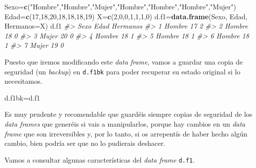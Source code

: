 \documentclass[
]{book}
\newenvironment{Shaded}{\begin{snugshade}}{\end{snugshade}}
\newcommand{\CommentTok}[1]{\textcolor[rgb]{0.56,0.35,0.01}{\textit{#1}}}
\newcommand{\DataTypeTok}[1]{\textcolor[rgb]{0.13,0.29,0.53}{#1}}
\newcommand{\DecValTok}[1]{\textcolor[rgb]{0.00,0.00,0.81}{#1}}
\newcommand{\KeywordTok}[1]{\textcolor[rgb]{0.13,0.29,0.53}{\textbf{#1}}}
\newcommand{\NormalTok}[1]{#1}
\newcommand{\StringTok}[1]{\textcolor[rgb]{0.31,0.60,0.02}{#1}}
\theoremstyle{definition}
\theoremstyle{definition}
\theoremstyle{definition}
\theoremstyle{remark}
\begin{document}
\begin{Shaded}
\begin{Highlighting}[]
\NormalTok{Sexo=}\KeywordTok{c}\NormalTok{(}\StringTok{"Hombre"}\NormalTok{,}\StringTok{"Hombre"}\NormalTok{,}\StringTok{"Mujer"}\NormalTok{,}\StringTok{"Hombre"}\NormalTok{,}\StringTok{"Hombre"}\NormalTok{,}\StringTok{"Hombre"}\NormalTok{,}\StringTok{"Mujer"}\NormalTok{)}
\NormalTok{Edad=}\KeywordTok{c}\NormalTok{(}\DecValTok{17}\NormalTok{,}\DecValTok{18}\NormalTok{,}\DecValTok{20}\NormalTok{,}\DecValTok{18}\NormalTok{,}\DecValTok{18}\NormalTok{,}\DecValTok{18}\NormalTok{,}\DecValTok{19}\NormalTok{)}
\NormalTok{X=}\KeywordTok{c}\NormalTok{(}\DecValTok{2}\NormalTok{,}\DecValTok{0}\NormalTok{,}\DecValTok{0}\NormalTok{,}\DecValTok{1}\NormalTok{,}\DecValTok{1}\NormalTok{,}\DecValTok{1}\NormalTok{,}\DecValTok{0}\NormalTok{)}
\NormalTok{d.f1=}\KeywordTok{data.frame}\NormalTok{(Sexo, Edad, }\DataTypeTok{Hermanos=}\NormalTok{X)}
\NormalTok{d.f1}
\CommentTok{\#\textgreater{}     Sexo Edad Hermanos}
\CommentTok{\#\textgreater{} 1 Hombre   17        2}
\CommentTok{\#\textgreater{} 2 Hombre   18        0}
\CommentTok{\#\textgreater{} 3  Mujer   20        0}
\CommentTok{\#\textgreater{} 4 Hombre   18        1}
\CommentTok{\#\textgreater{} 5 Hombre   18        1}
\CommentTok{\#\textgreater{} 6 Hombre   18        1}
\CommentTok{\#\textgreater{} 7  Mujer   19        0}
\end{Highlighting}
\end{Shaded}

Puesto que iremos modificando este \emph{data frame}, vamos a guardar una copia de seguridad (un \emph{backup}) en \texttt{d.f1bk} para poder recuperar su estado original si lo necesitamos.

\begin{Shaded}
\begin{Highlighting}[]
\NormalTok{d.f1bk=d.f1}
\end{Highlighting}
\end{Shaded}

Es muy prudente y recomendable que guardéis siempre copias de seguridad de los \emph{data frames} que generéis si vais a manipularlos, porque hay cambios en un \emph{data frame} que son irreversibles y, por lo tanto, si os arrepentís de haber hecho algún cambio, bien podría ser que no lo pudierais deshacer.

Vamos a consultar algunas características del \emph{data frame} \texttt{d.f1}.

\begin{Shaded}
\end{Shaded}
\end{document}
